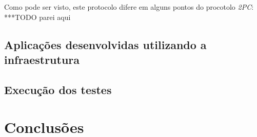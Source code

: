 \documentclass[11pt,twoside,a4paper]{book}
\renewcommand{\chaptermark}[1]{\markboth{\MakeUppercase{#1}}{}}
\begin{document}
Como pode ser visto, este protocolo difere em alguns pontos do procotolo \emph{2PC}: ***TODO parei aqui

\section{Aplicações desenvolvidas utilizando a infraestrutura}
\label{sec:aplicacoes}

\section{Execução dos testes}
\label{sec:testes}

\chapter{Conclusões}
\label{chap:conclusoes}

\renewcommand{\chaptermark}[1]{\markboth{\MakeUppercase{\appendixname\ \thechapter}} {\MakeUppercase{#1}} }
\fancyhead[RE,LO]{}
\appendix

% 

\backmatter \singlespacing   %

\end{document}
